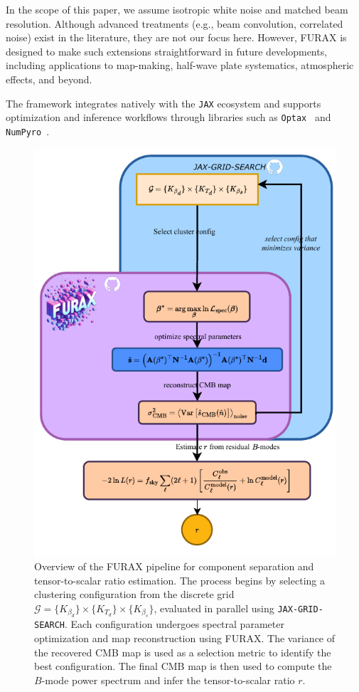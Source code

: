 \documentclass[%
 reprint,
bibnotes,
 amsmath,amssymb,
 aps,
floatfix, 
]{revtex4-2}
\begin{document}
In the scope of this paper, we assume isotropic white noise and matched beam resolution. Although advanced treatments (e.g., beam convolution, correlated noise) exist in the literature, they are not our focus here. However, FURAX is designed to make such extensions straightforward in future developments, including applications to map-making, half-wave plate systematics, atmospheric effects, and beyond.

The framework integrates natively with the \texttt{JAX} ecosystem and supports optimization and inference workflows through libraries such as \texttt{Optax}~\citep{optax} and \texttt{NumPyro}~\citep{numpyro}.

\begin{figure}[htbp]
    \centering
    \includegraphics[width=\linewidth]{figures/FURAX-CS.pdf}
    \caption{
        Overview of the \textsc{FURAX} pipeline for component separation and tensor-to-scalar ratio estimation. The process begins by selecting a clustering configuration from the discrete grid \( \mathcal{G} = \{K_{\beta_d}\} \times \{K_{T_d}\} \times \{K_{\beta_s}\} \), evaluated in parallel using \texttt{JAX-GRID-SEARCH}. Each configuration undergoes spectral parameter optimization and map reconstruction using \textsc{FURAX}. The variance of the recovered CMB map is used as a selection metric to identify the best configuration. The final CMB map is then used to compute the \( B \)-mode power spectrum and infer the tensor-to-scalar ratio \( r \). 
    }
    \label{fig:furax_pipeline}
\end{figure}
\end{document}
